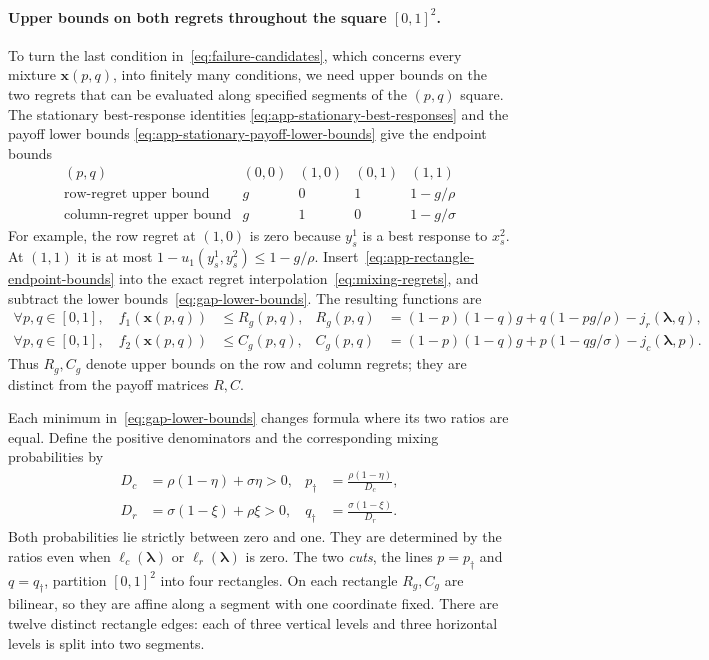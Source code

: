 \documentclass[11pt]{article}
\theoremstyle{remark}
\theoremstyle{plain}
\begin{document}
\paragraph{Upper bounds on both regrets throughout the square $[0,1]^2$.}
To turn the last condition in~\eqref{eq:failure-candidates}, which
concerns every mixture $\boldsymbol x(p,q)$, into finitely many
conditions, we need upper bounds on the two regrets that can be
evaluated along specified segments of the $(p,q)$ square.
The stationary best-response identities
\eqref{eq:app-stationary-best-responses} and the payoff lower bounds
\eqref{eq:app-stationary-payoff-lower-bounds} give the endpoint bounds
\begin{equation}
 \begin{array}{c|cccc}
 (p,q)&(0,0)&(1,0)&(0,1)&(1,1)\\ \hline
 \text{row-regret upper bound}&g&0&1&1-g/\rho\\
 \text{column-regret upper bound}&g&1&0&1-g/\sigma
 \end{array}
 \label{eq:app-rectangle-endpoint-bounds}
\end{equation}
For example, the row regret at $(1,0)$ is zero because $y_s^1$
is a best response to $x_s^2$. At $(1,1)$ it is at most
$1-u_1(y_s^1,y_s^2)\le1-g/\rho$.
Insert~\eqref{eq:app-rectangle-endpoint-bounds} into the exact
regret interpolation~\eqref{eq:mixing-regrets}, and subtract
the lower bounds~\eqref{eq:gap-lower-bounds}. The resulting functions are
\begin{equation}
 \begin{aligned}
 \forall p,q\in[0,1],\quad f_1(\boldsymbol x(p,q))&\le R_g(p,q),&
 R_g(p,q)&=(1-p)(1-q)g+q(1-pg/\rho)-j_r(\boldsymbol\lambda,q),\\
 \forall p,q\in[0,1],\quad f_2(\boldsymbol x(p,q))&\le C_g(p,q),&
 C_g(p,q)&=(1-p)(1-q)g+p(1-qg/\sigma)-j_c(\boldsymbol\lambda,p).
 \end{aligned}
 \label{eq:rectangle-upper-bounds}
\end{equation}
Thus $R_g,C_g$ denote upper bounds on the row and column regrets;
they are distinct from the payoff matrices $R,C$.

Each minimum in~\eqref{eq:gap-lower-bounds} changes formula where
its two ratios are equal. Define the positive denominators and
the corresponding mixing probabilities by
\begin{equation}
 \begin{aligned}
 D_c&=\rho(1-\eta)+\sigma\eta>0,&
 p_\dagger&=\frac{\rho(1-\eta)}{D_c},\\
 D_r&=\sigma(1-\xi)+\rho\xi>0,&
 q_\dagger&=\frac{\sigma(1-\xi)}{D_r}.
 \end{aligned}
 \label{eq:app-mixing-cuts}
\end{equation}
Both probabilities lie strictly between zero and one.
They are determined by the ratios even when $\ell_c(\boldsymbol\lambda)$ or
$\ell_r(\boldsymbol\lambda)$ is zero. The two \emph{cuts}, the lines
$p=p_\dagger$ and $q=q_\dagger$, partition $[0,1]^2$ into
four rectangles. On each rectangle $R_g,C_g$ are bilinear,
so they are affine along a segment with one coordinate fixed.
There are twelve distinct rectangle edges: each of three
vertical levels and three horizontal levels is split into two segments.
\end{document}
